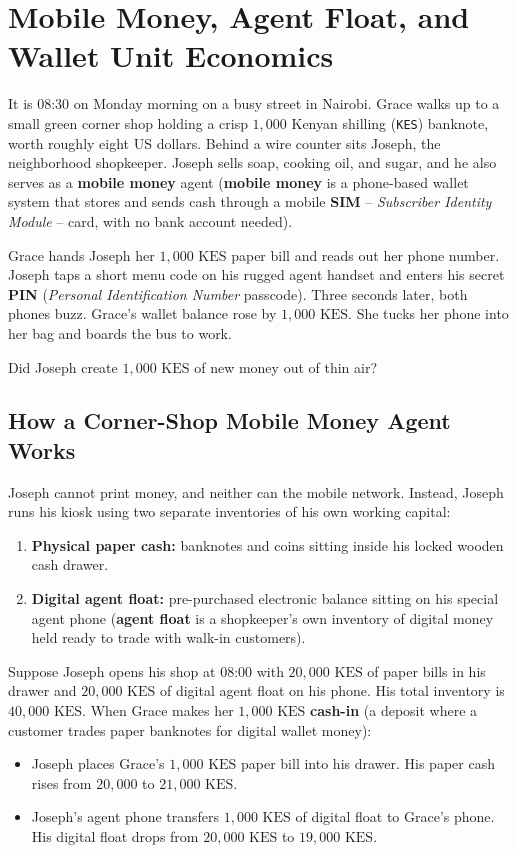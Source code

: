 \chapter{Mobile Money, Agent Float, and Wallet Unit Economics}
\label{ch:mobile-money-ledgers}
\chapterline

It is 08:30 on Monday morning on a busy street in Nairobi. Grace walks up to a small green corner shop holding a crisp $1{,}000$ Kenyan shilling (\texttt{KES}) banknote, worth roughly eight US dollars. Behind a wire counter sits Joseph, the neighborhood shopkeeper. Joseph sells soap, cooking oil, and sugar, and he also serves as a \textbf{mobile money} agent (\textbf{mobile money} is a phone-based wallet system that stores and sends cash through a mobile \textbf{SIM} -- \emph{Subscriber Identity Module} -- card, with no bank account needed).

Grace hands Joseph her $1{,}000\text{ KES}$ paper bill and reads out her phone number. Joseph taps a short menu code on his rugged agent handset and enters his secret \textbf{PIN} (\emph{Personal Identification Number} passcode). Three seconds later, both phones buzz. Grace's wallet balance rose by $1{,}000\text{ KES}$. She tucks her phone into her bag and boards the bus to work.

Did Joseph create $1{,}000\text{ KES}$ of new money out of thin air?

\section{How a Corner-Shop Mobile Money Agent Works}

Joseph cannot print money, and neither can the mobile network. Instead, Joseph runs his kiosk using two separate inventories of his own working capital:
\begin{enumerate}
  \item \textbf{Physical paper cash:} banknotes and coins sitting inside his locked wooden cash drawer.
  \item \textbf{Digital agent float:} pre-purchased electronic balance sitting on his special agent phone (\textbf{agent float} is a shopkeeper's own inventory of digital money held ready to trade with walk-in customers).
\end{enumerate}

Suppose Joseph opens his shop at 08:00 with $20{,}000\text{ KES}$ of paper bills in his drawer and $20{,}000\text{ KES}$ of digital agent float on his phone. His total inventory is $40{,}000\text{ KES}$. When Grace makes her $1{,}000\text{ KES}$ \textbf{cash-in} (a deposit where a customer trades paper banknotes for digital wallet money):
\begin{itemize}
  \item Joseph places Grace's $1{,}000\text{ KES}$ paper bill into his drawer. His paper cash rises from $20{,}000$ to $21{,}000\text{ KES}$.
  \item Joseph's agent phone transfers $1{,}000\text{ KES}$ of digital float to Grace's phone. His digital float drops from $20{,}000\text{ KES}$ to $19{,}000\text{ KES}$.
\end{itemize}

